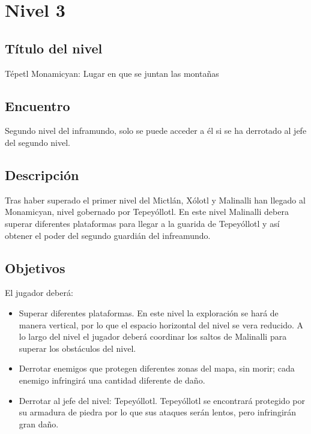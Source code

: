 \section{Nivel 3}\label{Nivel:Niv03}
	\subsection{Título del nivel}
	Tépetl Monamicyan: Lugar en que se juntan las montañas	
	\subsection{Encuentro}
Segundo nivel del inframundo, solo se puede acceder a él si se ha derrotado al jefe del segundo nivel.
	\subsection{Descripción}
	Tras haber superado el primer nivel del Mictlán, Xólotl y Malinalli han llegado al Monamicyan, nivel gobernado por Tepeyóllotl. En este nivel Malinalli debera superar diferentes plataformas para llegar a la guarida de Tepeyóllotl y así obtener el poder del segundo guardián del infreamundo.
	\subsection{Objetivos}
	El jugador deberá:
\begin{itemize}
	\item Superar diferentes plataformas. En este nivel la exploración se hará de manera vertical, por lo que el espacio horizontal del nivel se vera reducido. A lo largo del nivel el jugador deberá coordinar los saltos de Malinalli para superar los obstáculos del nivel.
	\item Derrotar enemigos que protegen diferentes zonas del mapa, sin morir; cada enemigo infringirá una cantidad diferente de daño.
	\item Derrotar al jefe del nivel: Tepeyóllotl. Tepeyóllotl se encontrará protegido por su armadura de piedra por lo que sus ataques serán lentos, pero infringirán gran daño.
\end{itemize}
